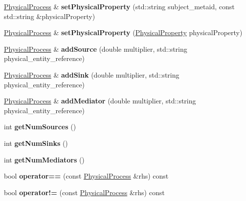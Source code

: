 \begin{DoxyCompactItemize}
\mbox{\label{classomexmeta_1_1PhysicalProcess_ac875058d67408246aa28cf58dd77ccf6}} 
\hyperlink{classomexmeta_1_1PhysicalProcess}{Physical\+Process} \& {\bfseries set\+Physical\+Property} (std\+::string subject\+\_\+metaid, const std\+::string \&physical\+Property)
\item 
\mbox{\label{classomexmeta_1_1PhysicalProcess_ac49bf4a1c21c6590a9d2af7ae93e13a7}} 
\hyperlink{classomexmeta_1_1PhysicalProcess}{Physical\+Process} \& {\bfseries set\+Physical\+Property} (\hyperlink{classomexmeta_1_1PhysicalProperty}{Physical\+Property} physical\+Property)
\item 
\mbox{\label{classomexmeta_1_1PhysicalProcess_ab42b6e17886e244f1f3c4611a5c4caef}} 
\hyperlink{classomexmeta_1_1PhysicalProcess}{Physical\+Process} \& {\bfseries add\+Source} (double multiplier, std\+::string physical\+\_\+entity\+\_\+reference)
\item 
\mbox{\label{classomexmeta_1_1PhysicalProcess_a0c41d7e4c7c750b8ab9705608ab69e74}} 
\hyperlink{classomexmeta_1_1PhysicalProcess}{Physical\+Process} \& {\bfseries add\+Sink} (double multiplier, std\+::string physical\+\_\+entity\+\_\+reference)
\item 
\mbox{\label{classomexmeta_1_1PhysicalProcess_a4ff546d673900730f12974917a2755b7}} 
\hyperlink{classomexmeta_1_1PhysicalProcess}{Physical\+Process} \& {\bfseries add\+Mediator} (double multiplier, std\+::string physical\+\_\+entity\+\_\+reference)
\item 
\mbox{\label{classomexmeta_1_1PhysicalProcess_a56459d9f0087a3f92b0aca5d148b65f5}} 
int {\bfseries get\+Num\+Sources} ()
\item 
\mbox{\label{classomexmeta_1_1PhysicalProcess_ac8b79af15d4d19042ee34abca25f679f}} 
int {\bfseries get\+Num\+Sinks} ()
\item 
\mbox{\label{classomexmeta_1_1PhysicalProcess_a717a352ce3bb956201174002f904cd26}} 
int {\bfseries get\+Num\+Mediators} ()
\item 
\mbox{\label{classomexmeta_1_1PhysicalProcess_a65585bf5cd473d509f6f66c96757ff8d}} 
bool {\bfseries operator==} (const \hyperlink{classomexmeta_1_1PhysicalProcess}{Physical\+Process} \&rhs) const
\item 
\mbox{\label{classomexmeta_1_1PhysicalProcess_af8298394b713807ec51c2b5f60afd00e}} 
bool {\bfseries operator!=} (const \hyperlink{classomexmeta_1_1PhysicalProcess}{Physical\+Process} \&rhs) const
\end{DoxyCompactItemize}
